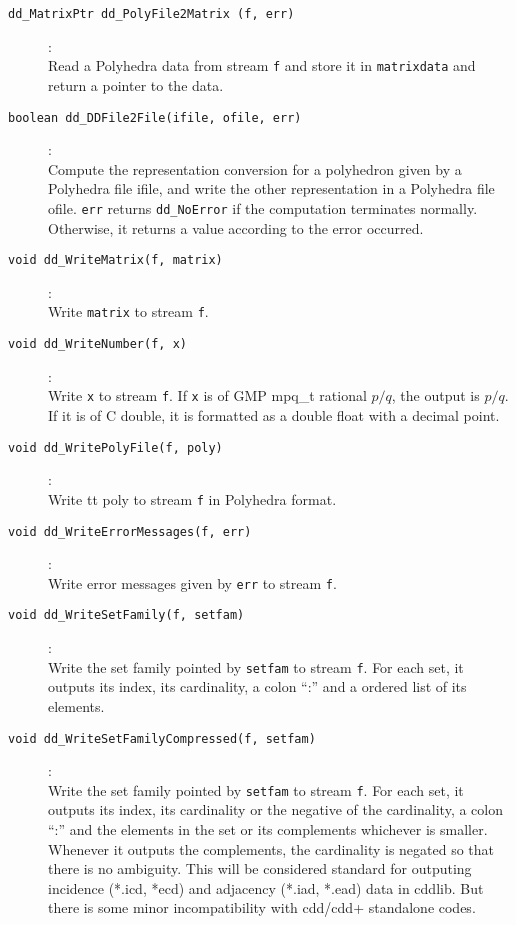 \documentclass[11pt]{article}
\newcommand {\0} {{\bf 0}}
\begin{document}
\begin{description}

\item[{\tt dd\_MatrixPtr dd\_PolyFile2Matrix (f, err)}]:\\
Read a Polyhedra data from stream {\tt f} and store it in {\tt matrixdata}
and return a pointer to the data.

\item[{\tt boolean dd\_DDFile2File(ifile, ofile, err)}]:\\
Compute the representation conversion for a polyhedron given
by a Polyhedra file ifile, and write the other representation
in a Polyhedra file ofile.  {\tt *err}
returns {\tt dd\_NoError} if the computation terminates normally.  Otherwise,
it returns a value according to the error occurred.

\item[{\tt void dd\_WriteMatrix(f, matrix)}]:\\
Write {\tt  matrix} to stream {\tt f}.

\item[{\tt void dd\_WriteNumber(f, x)}]:\\
Write {\tt x} to stream {\tt f}.  If {\tt x} is of GMP mpq\_t rational $p/q$,
the output is $p/q$.  If it is of C double, it is formatted as a double float
with a decimal point.

\item[{\tt void dd\_WritePolyFile(f, poly)}]:\\
Write {tt poly} to stream {\tt f} in Polyhedra format.

\item[{\tt void dd\_WriteErrorMessages(f, err)}]:\\
Write error messages given by {\tt err} to stream {\tt f}.

\item[{\tt void dd\_WriteSetFamily(f, setfam)}]:\\
Write the set family pointed by {\tt setfam} to stream {\tt f}.
For each set, it outputs its index, its cardinality,
a colon ``:'' and a ordered list of its elements.

\item[{\tt void dd\_WriteSetFamilyCompressed(f, setfam)}]:\\
Write the set family pointed by {\tt setfam} to stream {\tt f}.
For each set, it outputs its index, its cardinality or the
negative of the cardinality, a colon ``:''
 and the elements in the set or its complements whichever is smaller.
Whenever it outputs the complements, the cardinality is negated
so that there is no ambiguity.
This will be considered standard for
outputing incidence (*.icd, *ecd) and adjacency 
(*.iad, *.ead) data in cddlib.   But there is some minor incompatibility
with cdd/cdd+ standalone codes.


\end{description}
\end{document}

